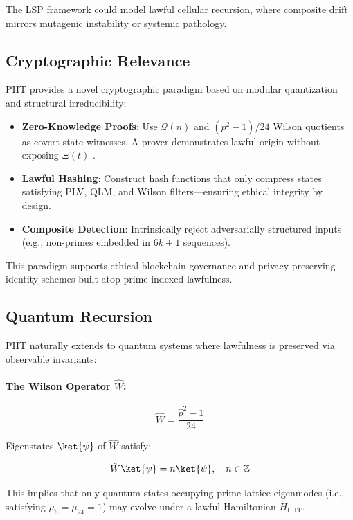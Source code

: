 \documentclass[12pt]{article}
\begin{document}
The LSP framework could model lawful cellular recursion, where composite drift mirrors mutagenic instability or systemic pathology.

\subsection{Cryptographic Relevance}

PIIT provides a novel cryptographic paradigm based on modular quantization and structural irreducibility:

\begin{itemize}
    \item \textbf{Zero-Knowledge Proofs}: Use $\mathcal{Q}(n)$ and $(p^2 - 1)/24$ Wilson quotients as covert state witnesses. A prover demonstrates lawful origin without exposing $\Xi(t)$ \cite{goldwasser1989knowledge}.
    \item \textbf{Lawful Hashing}: Construct hash functions that only compress states satisfying PLV, QLM, and Wilson filters—ensuring ethical integrity by design.
    \item \textbf{Composite Detection}: Intrinsically reject adversarially structured inputs (e.g., non-primes embedded in $6k \pm 1$ sequences).
\end{itemize}

This paradigm supports ethical blockchain governance and privacy-preserving identity schemes built atop prime-indexed lawfulness.

\subsection{Quantum Recursion}

PIIT naturally extends to quantum systems where lawfulness is preserved via observable invariants:

\paragraph{The Wilson Operator $\hat{W}$:}
\begin{equation}
\hat{W} = \frac{\hat{p}^2 - 1}{24}
\end{equation}

Eigenstates $\ket{\psi}$ of $\hat{W}$ satisfy:

\begin{equation}
\hat{W} \ket{\psi} = n \ket{\psi}, \quad n \in \mathbb{Z}
\end{equation}

This implies that only quantum states occupying prime-lattice eigenmodes (i.e., satisfying $\mu_6 = \mu_{24} = 1$) may evolve under a lawful Hamiltonian $H_\text{PIIT}$.
\end{document}
